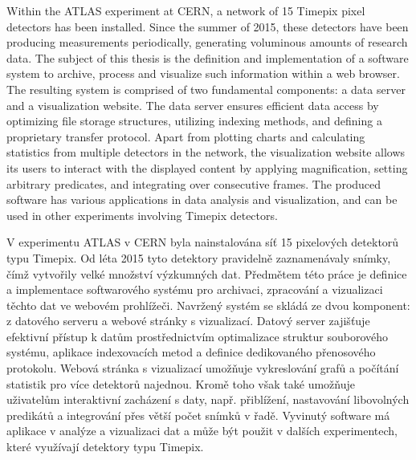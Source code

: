 \documentclass[11pt,twoside,a4paper]{book}
\begin{document}



 
	\abstractpage

	Within the ATLAS experiment at CERN, a network of 15 Timepix pixel detectors has been installed. Since the summer of 2015, these detectors have been producing measurements periodically, generating voluminous amounts of research data. The subject of this thesis is the definition and implementation of a software system to archive, process and visualize such information within a web browser. The resulting system is comprised of two fundamental components: a data server and a visualization website. The data server ensures efficient data access by optimizing file storage structures, utilizing indexing methods, and defining a proprietary transfer protocol. Apart from plotting charts and calculating statistics from multiple detectors in the network, the visualization website allows its users to interact with the displayed content by applying magnification, setting arbitrary predicates, and integrating over consecutive frames. The produced software has various applications in data analysis and visualization, and can be used in other experiments involving Timepix detectors.


	\baselineskip

	\noindent
	V experimentu ATLAS v CERN byla nainstalována síť 15 pixelových detektorů typu Timepix. Od léta 2015 tyto detektory pravidelně zaznamenávaly snímky, čímž vytvořily velké množství výzkumných dat. Předmětem této práce je definice a implementace softwarového systému pro archivaci, zpracování a vizualizaci těchto dat ve webovém prohlížeči. Navržený systém se skládá ze dvou komponent: z datového serveru a webové stránky s vizualizací. Datový server zajišťuje efektivní přístup k datům prostřednictvím optimalizace struktur souborového systému, aplikace indexovacích metod a definice dedikovaného přenosového protokolu. Webová stránka s vizualizací umožňuje vykreslování grafů a počítání statistik pro více detektorů najednou. Kromě toho však také umožňuje uživatelům interaktivní zacházení s daty, např. přiblížení, nastavování libovolných predikátů a integrování přes větší počet snímků v řadě. Vyvinutý software má aplikace v analýze a vizualizaci dat a může být použit v dalších experimentech, které využívají detektory typu Timepix.
\end{document}
